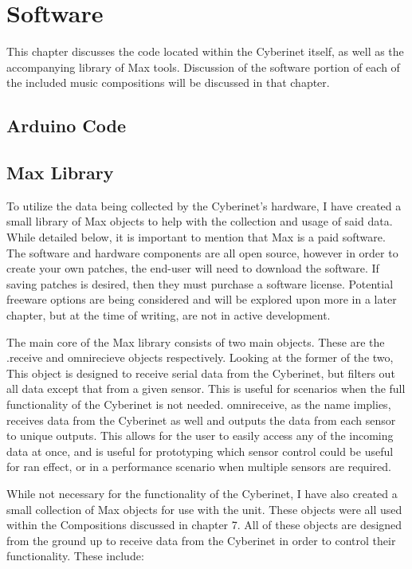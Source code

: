 \chapter{Software}
This chapter discusses the code located within the Cyberinet itself, as well as the accompanying library of Max tools. Discussion of the software portion of each of the included music compositions will be discussed in that chapter. 

\section{Arduino Code}

\section{Max Library}

To utilize the data being collected by the Cyberinet’s hardware, I have created a small library of Max objects to help with the collection and usage of said data. While detailed below, it is important to mention that Max is a paid software. The software and hardware components are all open source, however in order to create your own patches, the end-user will need to download the software. If saving patches is desired, then they must purchase a software license. Potential freeware options are being considered and will be explored upon more in a later chapter, but at the time of writing, are not in active development.

The main core of the Max library consists of two main objects. These are the .receive and omnirecieve objects respectively. Looking at the former of the two, This object is designed to receive serial data from the Cyberinet, but filters out all data except that from a given sensor. This is useful for scenarios when the full functionality of the Cyberinet is not needed. omnireceive, as the name implies, receives data from the Cyberinet as well and outputs the data from each sensor to unique outputs. This allows for the user to easily access any of the incoming data at once, and is useful for prototyping which sensor control could be useful for ran effect, or in a performance scenario when multiple sensors are required.

While not necessary for the functionality of the Cyberinet, I have also created a small collection of Max objects for use with the unit. These objects were all used within the Compositions discussed in chapter 7. All of these objects are designed from the ground up to receive data from the Cyberinet in order to control their functionality. These include:

